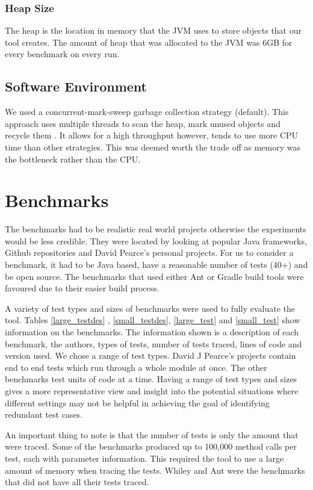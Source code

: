 \subsubsection{Heap Size}
The heap is the location in memory that the JVM uses to store objects that our tool creates. The amount of heap that was allocated to the JVM was 6GB for every benchmark on every run.

\subsection{Software Environment}

We used a concurrent-mark-sweep garbage collection strategy (default). This approach uses multiple threads to scan the heap, mark unused objects and recycle them \cite{oracle2015}. It allows for a high throughput however, tends to use more CPU time than other strategies. This was deemed worth the trade off as memory was the bottleneck rather than the CPU.

\section{Benchmarks}
\label{S:bench}
The benchmarks had to be realistic real world projects otherwise the experiments would be less credible. They were located by looking at popular Java frameworks, Github repositories and David Pearce's personal projects. For us to consider a benchmark, it had to be Java based, have a reasonable number of tests (40+) and be open source. The benchmarks that used either Ant or Gradle build tools were favoured due to their easier build process.

A variety of test types and sizes of benchmarks were used to fully evaluate the tool. Tables \ref{large_testdes} , \ref{small_testdes}, \ref{large_test} and \ref{small_test} show information on the benchmarks. The information shown is a description of each benchmark, the authors, types of tests, number of tests traced, lines of code and version used. We chose a range of test types. David J Pearce's projects contain end to end tests which run through a whole module at once. The other benchmarks test units of code at a time. Having a range of test types and sizes gives a more representative view and insight into the potential situations where different settings may not be helpful in achieving the goal of identifying redundant test cases.

An important thing to note is that the number of tests is only the amount that were traced. Some of the benchmarks produced up to 100,000 method calls per test, each with parameter information. This required the tool to use a large amount of memory when tracing the tests. Whiley and Ant were the benchmarks that did not have all their tests traced. 

